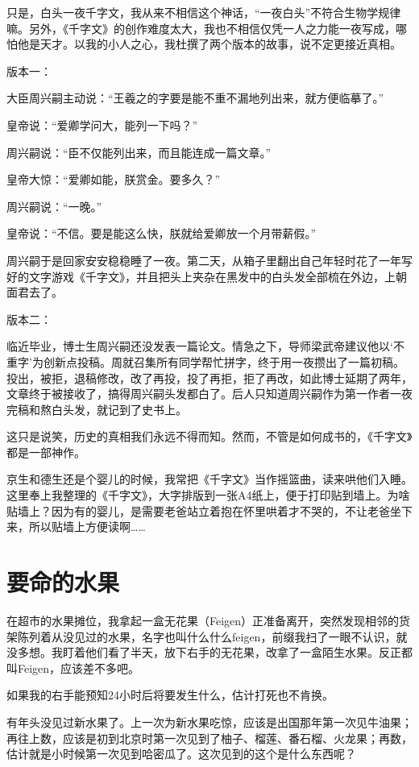 \documentclass[twoside,openright,headings=optiontohead]{ctexbook} %
\begin{document}
{只是，白头一夜千字文，我从来不相信这个神话，``一夜白头''不符合生物学规律嘛。另外，《千字文》的创作难度太大，我也不相信仅凭一人之力能一夜写成，哪怕他是天才。以我的小人之心，我杜撰了两个版本的故事，说不定更接近真相。

版本一：

大臣周兴嗣主动说：``王羲之的字要是能不重不漏地列出来，就方便临摹了。''

皇帝说：``爱卿学问大，能列一下吗？''

周兴嗣说：``臣不仅能列出来，而且能连成一篇文章。''

皇帝大惊：``爱卿如能，朕赏金。要多久？''

周兴嗣说：``一晚。''

皇帝说：``不信。要是能这么快，朕就给爱卿放一个月带薪假。''

周兴嗣于是回家安安稳稳睡了一夜。第二天，从箱子里翻出自己年轻时花了一年写好的文字游戏《千字文》，并且把头上夹杂在黑发中的白头发全部梳在外边，上朝面君去了。

版本二：

临近毕业，博士生周兴嗣还没发表一篇论文。情急之下，导师梁武帝建议他以`不重字'为创新点投稿。周就召集所有同学帮忙拼字，终于用一夜攒出了一篇初稿。投出，被拒，退稿修改，改了再投，投了再拒，拒了再改，如此博士延期了两年，文章终于被接收了，搞得周兴嗣头发都白了。后人只知道周兴嗣作为第一作者一夜完稿和熬白头发，就记到了史书上。

这只是说笑，历史的真相我们永远不得而知。然而，不管是如何成书的，《千字文》都是一部神作。

京生和德生还是个婴儿的时候，我常把《千字文》当作摇篮曲，读来哄他们入睡。这里奉上我整理的《千字文》，大字排版到一张A4纸上，便于打印贴到墙上。为啥贴墙上？因为有的婴儿，是需要老爸站立着抱在怀里哄着才不哭的，不让老爸坐下来，所以贴墙上方便读啊\ldots{}\ldots{}

\chapter*{要命的水果}\label{kaktusfeigen}

在超市的水果摊位，我拿起一盒无花果（Feigen）正准备离开，突然发现相邻的货架陈列着从没见过的水果，名字也叫什么什么feigen，前缀我扫了一眼不认识，就没多想。我盯着他们看了半天，放下右手的无花果，改拿了一盒陌生水果。反正都叫Feigen，应该差不多吧。

如果我的右手能预知24小时后将要发生什么，估计打死也不肯换。

有年头没见过新水果了。上一次为新水果吃惊，应该是出国那年第一次见牛油果；再往上数，应该是初到北京时第一次见到了柚子、榴莲、番石榴、火龙果；再数，估计就是小时候第一次见到哈密瓜了。这次见到的这个是什么东西呢？

}
\end{document}

